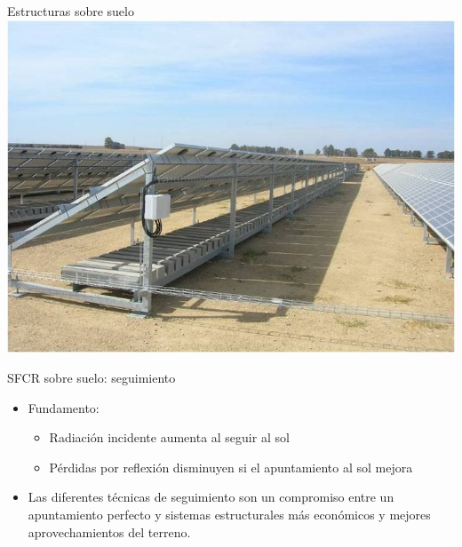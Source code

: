 \documentclass[xcolor={usenames,svgnames,dvipsnames}]{beamer}
\begin{document}
\begin{frame}[label=sec-1-3-3]{Estructuras sobre suelo}
\includegraphics[width=.9\linewidth]{../figs/EstructuraEstaticaSuelo.jpg}
\end{frame}

\begin{frame}[label=sec-1-3-4]{SFCR sobre suelo: seguimiento}
\begin{itemize}
\item \alert{Fundamento:}

\begin{itemize}
\item Radiación incidente aumenta al seguir al sol

\item Pérdidas por reflexión disminuyen si el apuntamiento al sol mejora
\end{itemize}

\item Las diferentes técnicas de seguimiento son un compromiso entre un
apuntamiento perfecto y sistemas estructurales más económicos y
mejores aprovechamientos del terreno.
\end{itemize}
\end{frame}
\end{document}
